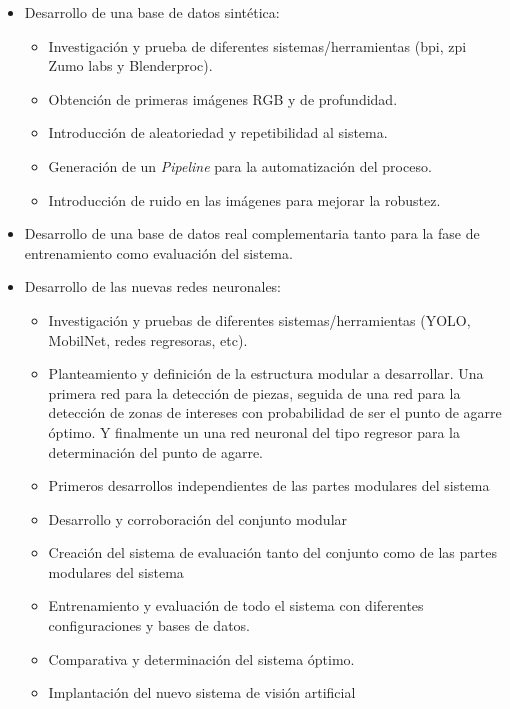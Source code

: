 \begin{itemize}
	\item Desarrollo de una base de datos sintética:
	\begin{itemize}
		\item Investigación y prueba de diferentes sistemas/herramientas (bpi, zpi Zumo labs y Blenderproc).
		\item Obtención de primeras imágenes RGB y de profundidad.
		\item Introducción de aleatoriedad y repetibilidad al sistema.
		\item Generación de un \textit{Pipeline} para la automatización del proceso.
		\item Introducción de ruido en las imágenes para mejorar la robustez.
	\end{itemize}
	\item Desarrollo de una base de datos real complementaria tanto para la fase de entrenamiento como evaluación del sistema.
	\item Desarrollo de las nuevas redes neuronales:
	\begin{itemize}
		\item Investigación y pruebas de diferentes sistemas/herramientas (YOLO, MobilNet, redes regresoras, etc).
		\item Planteamiento y definición de la estructura modular a desarrollar. Una primera red para la detección de piezas, seguida de una red para la detección de zonas de intereses con probabilidad de ser el punto de agarre óptimo. Y finalmente un una red neuronal del tipo regresor para la determinación del punto de agarre. 
		\item Primeros desarrollos independientes de las partes modulares del sistema
		\item Desarrollo y corroboración del conjunto modular
		\item Creación del sistema de evaluación tanto del conjunto como de las partes modulares del sistema
		\item Entrenamiento y evaluación de todo el sistema con diferentes configuraciones y bases de datos.
		\item Comparativa y determinación del sistema óptimo.
		\item Implantación del nuevo sistema de visión artificial
	\end{itemize}
\end{itemize}